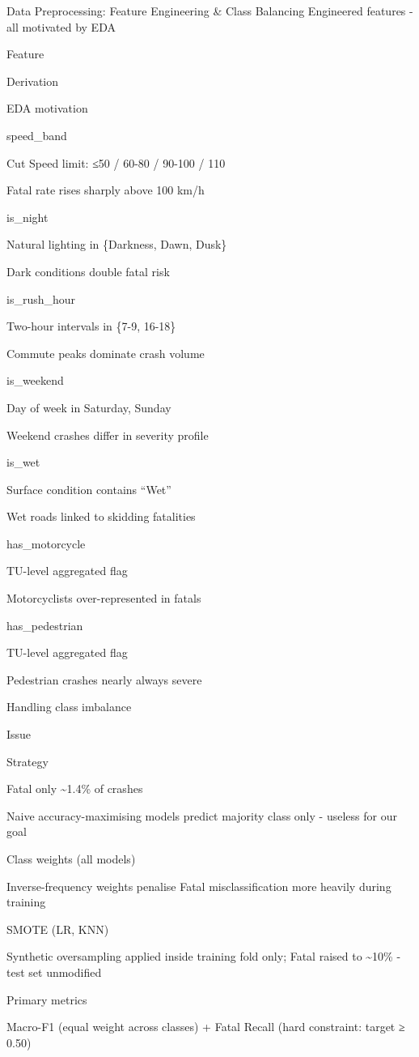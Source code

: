 \documentclass[
  ignorenonframetext,
]{beamer}
\begin{document}
\begin{frame}{Data Preprocessing: Feature Engineering \& Class
Balancing}
\label{data-preprocessing-feature-engineering-class-balancing}
Engineered features - all motivated by EDA

Feature

Derivation

EDA motivation

speed\_band

Cut Speed limit: ≤50 / 60-80 / 90-100 / 110

Fatal rate rises sharply above 100 km/h

is\_night

Natural lighting in \{Darkness, Dawn, Dusk\}

Dark conditions double fatal risk

is\_rush\_hour

Two-hour intervals in \{7-9, 16-18\}

Commute peaks dominate crash volume

is\_weekend

Day of week in Saturday, Sunday

Weekend crashes differ in severity profile

is\_wet

Surface condition contains ``Wet''

Wet roads linked to skidding fatalities

has\_motorcycle

TU-level aggregated flag

Motorcyclists over-represented in fatals

has\_pedestrian

TU-level aggregated flag

Pedestrian crashes nearly always severe

Handling class imbalance

Issue

Strategy

Fatal only \textasciitilde1.4\% of crashes

Naive accuracy-maximising models predict majority class only - useless
for our goal

Class weights (all models)

Inverse-frequency weights penalise Fatal misclassification more heavily
during training

SMOTE (LR, KNN)

Synthetic oversampling applied inside training fold only; Fatal raised
to \textasciitilde10\% - test set unmodified

Primary metrics

Macro-F1 (equal weight across classes) + Fatal Recall (hard constraint:
target ≥ 0.50)
\end{frame}
\end{document}
